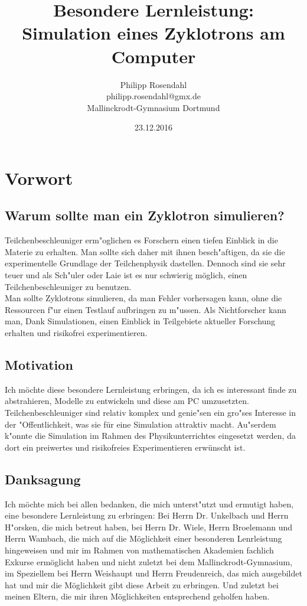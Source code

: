 \documentclass[14pt, a4paper]{report}
\begin{document}
\title{\bfseries \Large Besondere Lernleistung: \\ \Huge \color{titleblue}Simulation eines Zyklotrons am Computer}
\author{Philipp Rosendahl \\ philipp.rosendahl@gmx.de \\ Mallinckrodt-Gymnasium Dortmund}
\date{23.12.2016}
\maketitle

\tableofcontents

\chapter{Vorwort}
\section{Warum sollte man ein Zyklotron simulieren?}
Teilchenbeschleuniger erm"oglichen es Forschern einen tiefen Einblick in die
Materie zu erhalten. Man sollte sich daher mit ihnen besch"aftigen, da sie die
experimentelle Grundlage der Teilchenphysik dastellen. Dennoch sind sie sehr
teuer und als Sch"uler oder Laie ist es nur schwierig möglich, einen
Teilchenbeschleuniger zu benutzen. \\
Man sollte Zyklotrons simulieren, da man Fehler vorhersagen kann, ohne die Ressourcen
f"ur einen Testlauf aufbringen zu m"ussen. Als Nichtforscher kann man, Dank Simulationen, einen Einblick in Teilgebiete aktueller Forschung erhalten und risikofrei experimentieren.
\section{Motivation}
Ich möchte diese besondere Lernleistung erbringen, da ich es interessant finde 
zu abstrahieren, Modelle zu entwickeln und diese am PC umzusetzten. 
Teilchenbeschleuniger sind relativ komplex und genie"sen ein gro"ses Interesse
in der "Offentlichkeit, was sie für eine Simulation attraktiv macht. Au"serdem
k"onnte die Simulation im Rahmen des Physikunterrichtes eingesetzt werden, da dort 
ein preiwertes und risikofreies Experimentieren erwünscht ist.
\section{Danksagung}
Ich möchte mich bei allen bedanken, die mich unterst"utzt und ermutigt haben, eine
besondere Lernleistung zu erbringen: Bei Herrn Dr. Unkelbach und Herrn H"orsken, 
die mich betreut haben, bei Herrn Dr. Wiele, Herrn Broelemann und Herrn Wambach, 
die mich auf die Möglichkeit einer besonderen Lenrleistung hingeweisen und mir im
Rahmen von mathematischen Akademien fachlich Exkurse ermöglicht haben und nicht 
zuletzt bei dem Mallinckrodt-Gymnasium, im Speziellem bei Herrn Weishaupt und Herrn
Freudenreich, das mich ausgebildet hat und mir die Möglichkeit gibt diese Arbeit zu
erbringen. Und zuletzt bei meinen Eltern, die mir ihren Möglichkeiten entsprechend
geholfen haben.
\end{document}
